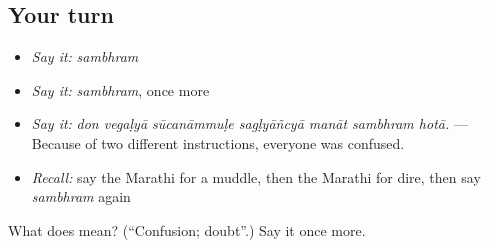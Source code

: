 \subsection*{Your turn}
\begin{itemize}
\raggedright
  \item \emph{Say it:} \emph{sambhram}
  \item \emph{Say it:} \emph{sambhram}, once more
  \item \emph{Say it:} \emph{don vegaḷyā sūcanāmmuḷe sagḷyāñcyā manāt sambhram hotā.} — Because of two different instructions, everyone was confused.
  \item \emph{Recall:} say the Marathi for a muddle, then the Marathi for dire, then say \emph{sambhram} again
\end{itemize}

\begin{tcolorbox}[breakable,colback=teal!4,colframe=teal!35!black,title={Before you move on}]
What does  mean? (\textquotedblleft{}Confusion; doubt\textquotedblright{}.) Say it once more.
\end{tcolorbox}
